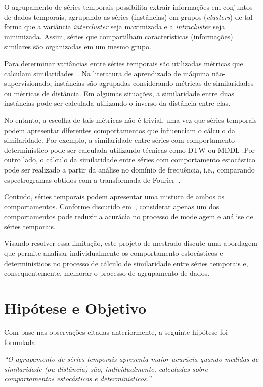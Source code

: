 O agrupamento de séries temporais possibilita extrair informações em conjuntos de dados temporais, agrupando as séries (instâncias) em grupos (\textit{clusters}) de tal forma que a variância \textit{intercluster} seja maximizada e a \textit{intracluster} seja minimizada. Assim, séries que compartilham características (informações) similares são organizadas em um mesmo grupo.

Para determinar variâncias entre séries temporais são utilizadas métricas que calculam similaridades~\cite{Mori2016}. Na literatura de aprendizado de máquina não-supervisionado, instâncias são agrupadas considerando métricas de similaridades ou métricas de distância. Em algumas situações, a similaridade entre duas instâncias pode ser calculada utilizando o inverso da distância entre elas. 

No entanto, a escolha de tais métricas não é trivial, uma vez que séries temporais podem apresentar diferentes comportamentos que influenciam o cálculo da similaridade. Por exemplo, a similaridade entre séries com comportamento determinístico pode ser calculada utilizando técnicas como \ac{DTW} \cite{tormene2009matching} ou \ac{MDDL} \cite{Araujo2015, Araujo2013}.Por outro lado, o cálculo da similaridade entre séries com comportamento estocástico pode ser realizado a partir da análise no domínio de frequência, i.e., comparando espectrogramas obtidos com a transformada de Fourier~\cite{morettin2006}.

Contudo, séries temporais podem apresentar uma mistura de ambos os comportamentos. Conforme discutido em~, considerar apenas um dos comportamentos pode reduzir a acurácia no processo de modelagem e análise de séries temporais.

Visando resolver essa limitação, este projeto de mestrado discute uma abordagem que permite analisar individualmente os comportamento estocásticos e determinísticos no processo de cálculo de similaridade entre séries temporais e, consequentemente, melhorar o processo de agrupamento de dados.

\section{Hipótese e Objetivo}

Com base nas observações citadas anteriormente, a seguinte hipótese foi formulada:

\begin{center}
\textit{``O agrupamento de séries temporais apresenta maior acurácia quando medidas de similaridade (ou distância) são, individualmente, calculadas sobre comportamentos estocásticos e determinísticos.''}
\end{center}

